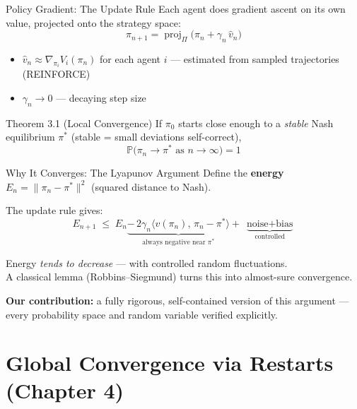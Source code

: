 \documentclass[aspectratio=169,11pt]{beamer}
\newcommand{\ip}[2]{\langle #1,\, #2 \rangle}
\newcommand{\norm}[1]{\| #1 \|}
\newcommand{\Prob}{\mathbb{P}}
\DeclareMathOperator{\proj}{proj}
\begin{document}
\begin{frame}{Policy Gradient: The Update Rule}
  Each agent does gradient ascent on its own value, projected onto the strategy space:
  \[
    \pi_{n+1} = \proj_\Pi\!\bigl(\pi_n + \gamma_n\,\hat v_n\bigr)
  \]

  \begin{itemize}
    \item $\hat v_n \approx \nabla_{\pi_i} V_i(\pi_n)$ for each agent $i$ \quad --- estimated from sampled trajectories (REINFORCE)
    \item $\gamma_n \to 0$ \quad --- decaying step size
  \end{itemize}

  \bigskip\bigskip

  \begin{block}{Theorem 3.1 (Local Convergence)}
    If $\pi_0$ starts close enough to a \emph{stable} Nash equilibrium $\pi^*$
    {\normalfont\small(stable = small deviations self-correct)},
    \[
      \Prob\!\bigl(\pi_n \to \pi^* \text{ as } n\to\infty\bigr) = 1
    \]
  \end{block}
\end{frame}

\begin{frame}{Why It Converges: The Lyapunov Argument}
  Define the \textbf{energy} $E_n = \norm{\pi_n - \pi^*}^2$ \quad (squared distance to Nash).

  \bigskip

  The update rule gives:
  \[
    E_{n+1} \;\le\; E_n
    \underbrace{-\, 2\gamma_n \ip{v(\pi_n)}{\pi_n - \pi^*}}_{\text{always negative near } \pi^*}
    +\; \underbrace{\text{noise} + \text{bias}}_{\text{controlled}}
  \]

  \bigskip

  Energy \emph{tends to decrease} --- with controlled random fluctuations.\\[6pt]
  A classical lemma (Robbins--Siegmund) turns this into almost-sure convergence.

  \bigskip

  \textbf{Our contribution:} a fully rigorous, self-contained version of this argument ---\\
  every probability space and random variable verified explicitly.
\end{frame}

\section{Global Convergence via Restarts (Chapter 4)}
\end{document}
